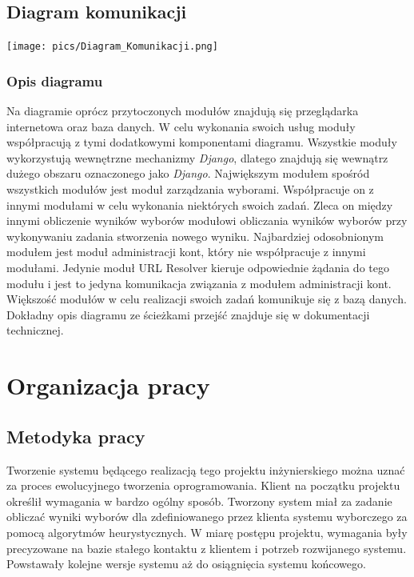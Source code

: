 \documentclass[polish,11pt]{aghthesis}
\begin{document}
\subsection{Diagram komunikacji}
\begin{center}
\centerline{\texttt{[image: pics/Diagram\_Komunikacji.png]}}
\end{center}
\newpage

\subsubsection{Opis diagramu}
Na diagramie oprócz przytoczonych modułów znajdują się przeglądarka internetowa oraz
baza danych. W celu wykonania swoich usług moduły współpracują z tymi dodatkowymi
komponentami diagramu. Wszystkie moduły wykorzystują wewnętrzne mechanizmy \textit{Django},
dlatego znajdują się wewnątrz dużego obszaru oznaczonego jako \textit{Django}. Największym
modułem spośród wszystkich modułów jest moduł zarządzania wyborami. Współpracuje on
z innymi modułami w celu wykonania niektórych swoich zadań. Zleca on między innymi
obliczenie wyników wyborów modułowi obliczania wyników wyborów przy wykonywaniu
zadania stworzenia nowego wyniku. Najbardziej odosobnionym modułem jest moduł
administracji kont, który nie współpracuje z innymi modułami. Jedynie moduł URL Resolver
kieruje odpowiednie żądania do tego modułu i jest to jedyna komunikacja związania z
modułem administracji kont. Większość modułów w celu realizacji swoich zadań komunikuje
się z bazą danych. Dokładny opis diagramu ze ścieżkami przejść znajduje się w dokumentacji
technicznej.

\section{Organizacja pracy}
\subsection{Metodyka pracy}
Tworzenie systemu będącego realizacją tego projektu inżynierskiego można uznać za
proces ewolucyjnego tworzenia oprogramowania. Klient na początku projektu określił
wymagania w bardzo ogólny sposób. Tworzony system miał za zadanie obliczać wyniki
wyborów dla zdefiniowanego przez klienta systemu wyborczego za pomocą algorytmów
heurystycznych. W miarę postępu projektu, wymagania były precyzowane na bazie stałego
kontaktu z klientem i potrzeb rozwijanego systemu. Powstawały kolejne wersje systemu aż
do osiągnięcia systemu końcowego.
\end{document}
